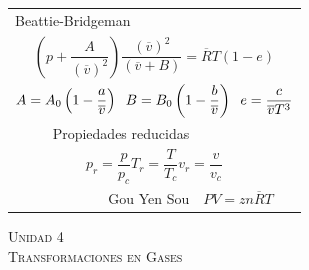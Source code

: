\documentclass[11pt,a4paper,twocolumn]{article}
\newcommand{\unidad}[2]{\begin{center}
		\fontsize{10}{10}\selectfont\color{gray!50!black}\scshape Unidad #1 \\
		\fontsize{14}{14}\selectfont \scshape #2
	\end{center} \vspace{-.5cm}}
\begin{document}
\begin{tcolorbox}[colback=white!97!brown, colframe=brown!15!gray]
\begin{tabular}{r l}
			\multicolumn{2}{l}{\vspace{.1cm} Beattie-Bridgeman} \\
			\multicolumn{2}{c}{\vspace{.1cm}$ \left( p+\dfrac{A}{(\overline{v})^2} \right) \dfrac{(\overline{v})^2}{(\overline{v}+B)}=\overline{R}T(1-e) $} \\
			\multicolumn{2}{c}{\vspace{.1cm}$ A=A_{0} \left( 1- \dfrac{a}{\overline{v}} \right) \hspace{.2cm}  B=B_{0} \left( 1- \dfrac{b}{\overline{v}} \right) \hspace{.2cm} e=\dfrac{c}{\overline{v}T^{3}} $} \\
	\vspace{.1cm}		Propiedades reducidas & \\
			\multicolumn{2}{c}{\vspace{.2cm} $ p_{r}=\dfrac{p}{p_{c}} T_{r}=\dfrac{T}{T_{c}} v_{r}=\dfrac{v}{v_{c}}$} \\
			\vspace{.1cm} Gou Yen Sou & $PV=zn\overline{R}T$ \\
		\end{tabular}
	\end{tcolorbox}

\newpage


	\unidad{4}{Transformaciones en Gases}
	
\end{document}
